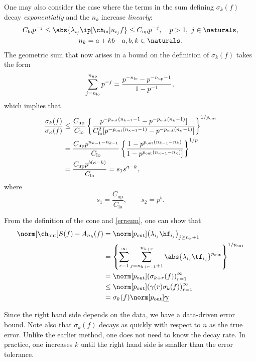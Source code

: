 \documentclass[final]{elsarticle}
\newcommand{\chin}{\ch_{\text{\rm{in}}}}
\newcommand{\chout}{\ch_{\text{\rm{out}}}}
\newcommand{\pout}{p_{\text{\rm{out}}}}
\newcommand{\bgamma}{\underline{\boldsymbol\gamma}}
\theoremstyle{definition}
\theoremstyle{remark}
\DeclareMathOperator{\up}{up}
\DeclareMathOperator{\lo}{lo}
\begin{document}
One may also consider the case where the terms in the sum defining $\sigma_k(f)$ decay \emph{exponentially} and the $n_k$ increase \emph{linearly}:
\begin{gather*}
C_{\lo} p^{-j} \le \abs{\lambda_{i_j} \ip[\chin]{u_{i_j}}{f}} \le C_{\up} p^{-j}, \quad  p>1, \ j \in \naturals, \\
n_k = a +kb  \quad a, b, k \in \naturals.
\end{gather*}
The geometric sum that now arises in a bound on the  definition of $\sigma_k(f)$ takes the form
\begin{equation*}
\sum_{j=n_{\lo}}^{n_{\up}} p^{-j} = \frac{p^{-n_{\lo}} - p^{-n_{\up}-1}}{1-p^{-1}}, \\
\end{equation*}
which implies that
\begin{align*}
\frac{\sigma_k(f)}{\sigma_\kappa(f)} & \le
\frac{C_{\up}}  {C_{\lo}} \left\{\frac{p^{-\pout( n_{k-1}-1} - p^{- \pout(n_{k}-1)}]}  {C_{\lo}^2[p^{-\pout(n_{\kappa-1}-1)} - p^{-\pout(n_{\kappa}-1)}]}\right\}^{1/\pout} \\
& =
\frac{C_{\up} p^{n_{\kappa-1}-n_{k-1}}} {C_{\lo}}  \left\{\frac{1 - p^{\pout(n_{k-1}-n_{k})}} {1 - p^{\pout(n_{\kappa-1}-n_{\kappa})}]} \right\}^{1/p}\\
& = \frac{ C_{\up} p^{b(\kappa-k)}}  {C_{\lo}}  = s_1 s^{\kappa-k},
\end{align*}
where
\[
s_1 = \frac{ C_{\up}}  {C_{\lo}} , \qquad s_2 = p^b.
\]

From the definition of the cone and \eqref{errsum}, one can show that
\begin{align*}
\norm[\chout]{S(f)-A_{n_k}(f)} &= \norm[\pout]{\left(\lambda_{i_j} \hf_{i_j} \right)_{j\ge n_k+1}} \\
&= \left\{\sum_{r=1}^\infty \sum_{j=n_{k+r-1}+1}^{n_{k+r}}  \abs{\lambda_{i_j}\tf_{i_j} }^{\pout}  \right\}^{1/\pout}\\
&= \norm[\pout]{ \left(\sigma_{k+r}(f)\right)_{r=1}^{\infty}} \\
&\le \norm[\pout]{ \left(\gamma(r)\sigma_{k}(f)\right)_{r=1}^{\infty}} \\
&= \sigma_{k}(f)\norm[\pout]{\bgamma} \\
\end{align*}

Since the right hand side depends on the data, we have a data-driven error bound.  Note also that $\sigma_k(f)$ decays as quickly with respect to $n$ as the true error.  Unlike the earlier method, one does not need to know the decay rate.  In practice, one increases $k$ until the right hand side is smaller than the error tolerance.
\end{document}
